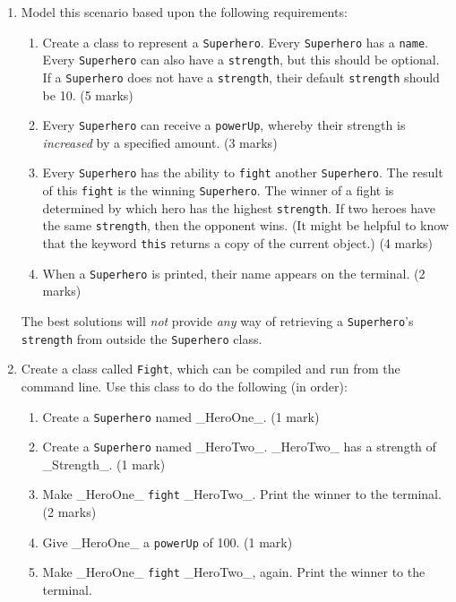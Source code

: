 \documentclass[11pt]{article}
\begin{document}
\begin{enumerate}
	
\item Model this scenario based upon the following requirements:

\begin{enumerate}

	\item Create a class to represent a \texttt{Superhero}. Every \texttt{Superhero} has a \texttt{name}. Every \texttt{Superhero} can also have a \texttt{strength}, but this should be optional. If a \texttt{Superhero} does not have a \texttt{strength}, their default \texttt{strength} should be 10. (5 marks)
	
	\item Every \texttt{Superhero} can receive a \texttt{powerUp}, whereby their strength is \emph{increased} by a specified amount. (3 marks)
	
	\item Every \texttt{Superhero} has the ability to \texttt{fight} another \texttt{Superhero}. The result of this \texttt{fight} is the winning \texttt{Superhero}. The winner of a fight is determined by which hero has the highest \texttt{strength}. If two heroes have the same \texttt{strength}, then the opponent wins. (It might be helpful to know that the keyword \texttt{this} returns a copy of the current object.) (4 marks)
	
	\item When a \texttt{Superhero} is printed, their name appears on the terminal. (2 marks)

\end{enumerate}

The best solutions will \emph{not} provide \emph{any} way of retrieving a \texttt{Superhero}'s \texttt{strength} from outside the \texttt{Superhero} class.

\item Create a class called \texttt{Fight}, which can be compiled and run from the command line. Use this class to do the following (in order):

\begin{enumerate}

	\item Create a \texttt{Superhero} named _HeroOne_. (1 mark)
	
	\item Create a \texttt{Superhero} named _HeroTwo_. _HeroTwo_ has a strength of _Strength_. (1 mark)
	
	\item Make _HeroOne_ \texttt{fight} _HeroTwo_. Print the winner to the terminal. (2 marks)
	
	\item Give _HeroOne_ a \texttt{powerUp} of 100. (1 mark)
	
	\item Make _HeroOne_ \texttt{fight} _HeroTwo_, again. Print the winner to the terminal.

\end{enumerate}

\end{enumerate}
\end{document}
